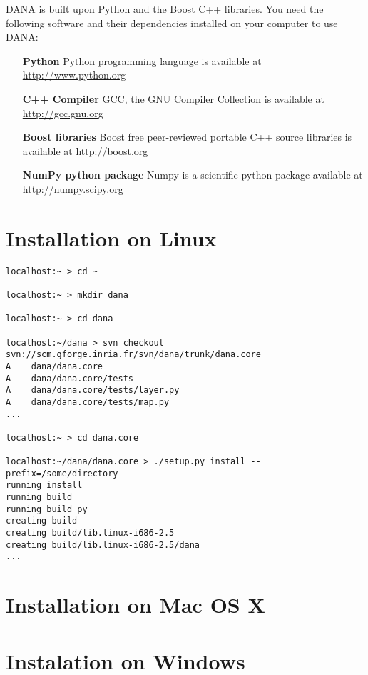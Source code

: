 DANA is built upon Python and the Boost C++ libraries. You need the following
software and their dependencies installed on your computer to use DANA:

\begin{itemize}
    \item [{\bf Python}]
          Python programming language is available at \url{http://www.python.org}\\
          
    \item [{\bf C++ Compiler}]
          GCC, the GNU Compiler Collection is available at \url{http://gcc.gnu.org}\\
          
    \item [{\bf Boost libraries}]
          Boost free peer-reviewed portable C++ source libraries 
          is available at \url{http://boost.org}\\
          
     \item [{\bf NumPy python package}]
           Numpy is a scientific python package available at \url{http://numpy.scipy.org}

\end{itemize}

\section{Installation on Linux}

\begin{verbatim}
localhost:~ > cd ~

localhost:~ > mkdir dana

localhost:~ > cd dana

localhost:~/dana > svn checkout svn://scm.gforge.inria.fr/svn/dana/trunk/dana.core
A    dana/dana.core
A    dana/dana.core/tests
A    dana/dana.core/tests/layer.py
A    dana/dana.core/tests/map.py
...

localhost:~ > cd dana.core

localhost:~/dana/dana.core > ./setup.py install --prefix=/some/directory
running install
running build
running build_py
creating build
creating build/lib.linux-i686-2.5
creating build/lib.linux-i686-2.5/dana
...

\end{verbatim}

\section{Installation on Mac OS X}
\section{Instalation on Windows}

